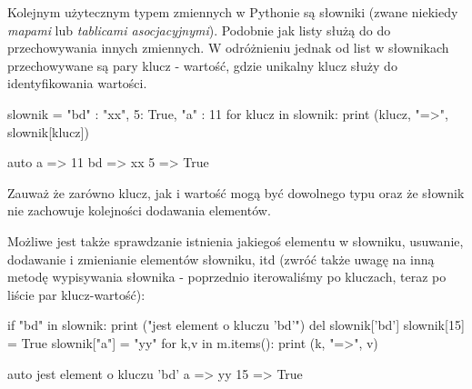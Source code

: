 \documentclass{pdfBooklets}
\begin{document}
Kolejnym użytecznym typem zmiennych w Pythonie są słowniki (zwane niekiedy \emph{mapami} lub \emph{tablicami asocjacyjnymi}). Podobnie jak listy służą do do przechowywania innych zmiennych.
W odróżnieniu jednak od list w słownikach przechowywane są pary klucz - wartość, gdzie unikalny klucz służy do identyfikowania wartości.

\begin{CodeFrame}[python]{0.60\textwidth}
slownik = { "bd" : "xx", 5: True, "a" : 11 }
for klucz in slownik:
    print (klucz, "=>", slownik[klucz])
\end{CodeFrame}
\begin{CodeFrame}{auto}
a => 11
bd => xx
5 => True
\end{CodeFrame}

Zauważ że zarówno klucz, jak i wartość mogą być dowolnego typu oraz że słownik nie zachowuje kolejności dodawania elementów.

Możliwe jest także sprawdzanie istnienia jakiegoś elementu w słowniku, usuwanie, dodawanie i zmienianie elementów słowniku, itd
(zwróć także uwagę na inną metodę wypisywania słownika - poprzednio iterowaliśmy po kluczach, teraz po liście par klucz-wartość):

\begin{CodeFrame}[python]{0.60\textwidth}
if "bd" in slownik:
    print ("jest element o kluczu 'bd'")
    del slownik['bd']
slownik[15] = True
slownik["a"] = "yy"
for k,v in m.items():
    print (k, "=>", v)
\end{CodeFrame}
\begin{CodeFrame}{auto}
jest element o kluczu 'bd'
a => yy
15 => True
\end{CodeFrame}

\end{document}
